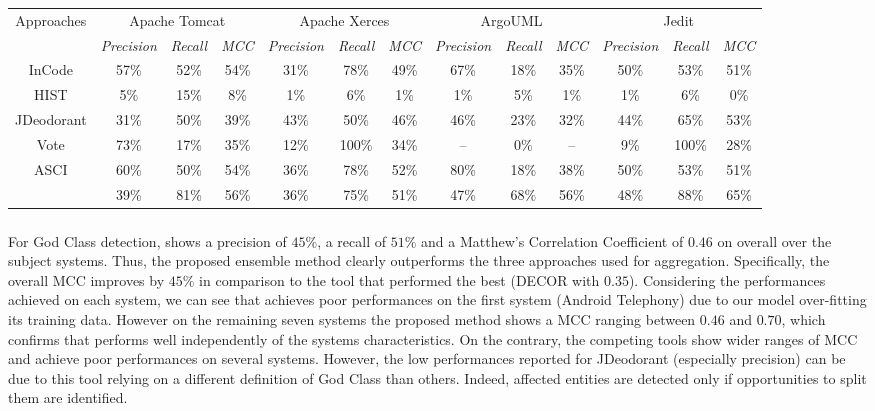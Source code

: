 \begin{table}
\begin{adjustbox}{width=\textwidth}
\begin{tabular}{|c|c|c|c|c|c|c|c|c|c|c|c|c|}
\hline
\multirow{2}{*}{Approaches}& 
\multicolumn{3}{c|}{
	Apache Tomcat
} 
&\multicolumn{3}{c|}{
	Apache Xerces
}
&\multicolumn{3}{c|}{
	ArgoUML
}
&\multicolumn{3}{c|}{
	Jedit 
}\bigstrut [t] \\ 
\cline{2-13}
&\textit{Precision}&\textit{Recall}&\textit{  MCC  }
&\textit{Precision}&\textit{Recall}&\textit{  MCC  }
&\textit{Precision}&\textit{Recall}&\textit{  MCC  }
&\textit{Precision}&\textit{Recall}&\textit{  MCC  } \bigstrut [t]\\
\hline
InCode &57\%&52\%&54\%&31\%&78\%&49\%&67\%&18\%&35\%&50\%&53\%&51\% \bigstrut \\ \hline
HIST &5\%&15\%&8\%&1\%&6\%&1\%&1\%&5\%&1\%&1\%&6\%&0\% \bigstrut \\ \hline
JDeodorant &31\%&50\%&39\%&43\%&50\%&46\%&46\%&23\%&32\%&44\%&65\%&53\% \bigstrut \\ \hline
Vote &73\%&17\%&35\%&12\%&100\%&34\%&--&0\%&--&9\%&100\%&28\% \bigstrut \\ \hline
ASCI &60\%&50\%&54\%&36\%&78\%&52\%&80\%&18\%&38\%&50\%&53\%&51\% \bigstrut \\ \hline
\textbf{\NAME{}} &39\%&81\%&56\%&36\%&75\%&51\%&47\%&68\%&56\%&48\%&88\%&65\% \bigstrut \\ \hline
\end{tabular}
\end{adjustbox}
\end{table}

\subsubsection{\RQone{}}
For God Class detection, \NAME{} shows a precision of $45\%$, a recall of $51\%$ and a Matthew's Correlation Coefficient of $0.46$ on overall over the subject systems. Thus, the proposed ensemble method clearly outperforms the three approaches used for aggregation. Specifically, the overall MCC improves by $45\%$ in comparison to the tool that performed the best (DECOR with $0.35$). Considering the performances achieved on each system, we can see that \NAME{} achieves poor performances on the first system (Android Telephony) due to our model over-fitting its training data. However on the remaining seven systems the proposed method shows a MCC ranging between $0.46$ and $0.70$, which confirms that \NAME{} performs well independently of the systems characteristics. On the contrary, the competing tools show wider ranges of MCC and achieve poor performances on several systems. However, the low performances reported for JDeodorant (especially precision) can be due to this tool relying on a different definition of God Class than others. Indeed, affected entities are detected only if opportunities to split them are identified.

